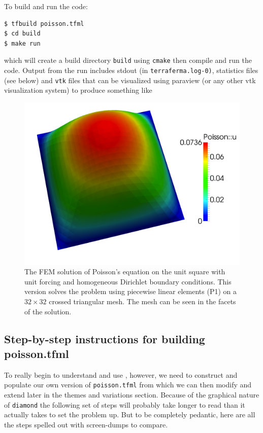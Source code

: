 To build and run the code:
\begin{lstlisting}[style=Bash]
$ tfbuild poisson.tfml
$ cd build
$ make run 
\end{lstlisting}
which will create a build directory \texttt{build} using
\texttt{cmake} then compile and run the code. Output from the run
includes stdout (in \texttt{terraferma.log-0)}, statistics files (see
below) and \texttt{vtk} files that can be visualized using paraview
(or any other vtk visualization system) to produce something like
\begin{figure}[h]
  \centering
  \includegraphics[width=.8\textwidth]{figures/poisson_simple.png}
  \caption{\protect\small The FEM solution of Poisson's equation on the unit square
    with unit forcing and homogeneous Dirichlet boundary conditions.
    This version solves the problem using piecewise linear elements (P1)
    on a $32\times 32$ crossed triangular mesh. The mesh can be seen
    in the facets of the solution.}
  \label{fig:simple_poisson}
\end{figure}

\subsection{Step-by-step instructions for building poisson.tfml}
\label{sec:step-step-instr}

To really begin to understand and use \TF{}, however, we need to
construct and populate our own version of \texttt{poisson.tfml} from
which we can then modify and extend later in the themes and variations
section.  Because of the graphical nature of \texttt{diamond} the
following set of steps will probably take longer to read than it
actually takes to set the problem up.  But to be completely pedantic,
here are all the steps spelled out with screen-dumps to compare.

